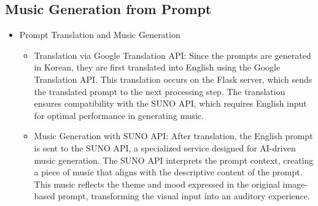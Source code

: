 \documentclass[conference]{IEEEtran}
\begin{document}
\subsection{Music Generation from Prompt }
\begin{itemize}
    \item Prompt Translation and Music Generation
\begin{itemize}
    \item Translation via Google Translation API: Since the prompts are generated in Korean, they are first translated into English using the Google Translation API. This translation occurs on the Flask server, which sends the translated prompt to the next processing step. The translation ensures compatibility with the SUNO API, which requires English input for optimal performance in generating music.\\
    \item Music Generation with SUNO API: After translation, the English prompt is sent to the SUNO API, a specialized service designed for AI-driven music generation. The SUNO API interprets the prompt context, creating a piece of music that aligns with the descriptive content of the prompt. This music reflects the theme and mood expressed in the original image-based prompt, transforming the visual input into an auditory experience.\\
\end{itemize}
\end{itemize}
\end{document}
